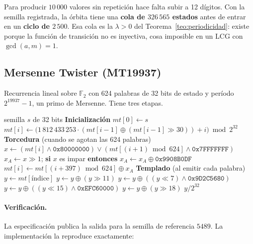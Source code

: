 Para producir $10\,000$ valores sin repetición hace falta subir a 12 dígitos.
Con la semilla registrada, la órbita tiene una \textbf{cola de $326\,565$
estados} antes de entrar en un \textbf{ciclo de $2\,500$}. Esa cola es la
$\lambda > 0$ del Teorema~\ref{teo:periodicidad}: existe porque la función de
transición no es inyectiva, cosa imposible en un LCG con $\gcd(a,m)=1$.

\subsection{Mersenne Twister (MT19937)}

Recurrencia lineal sobre $\mathbb{F}_2$ con 624 palabras de 32 bits de estado y
período $2^{19937}-1$, un primo de Mersenne. Tiene tres etapas.

\begin{algorithm}[H]
\caption{MT19937}
\begin{algorithmic}[1]
\Require semilla $s$ de 32 bits
\Statex \textbf{Inicialización}
\State $mt[0] \gets s$
  \State $mt[i] \gets \bigl(1\,812\,433\,253 \cdot (mt[i-1] \oplus (mt[i-1] \gg 30)) + i\bigr) \bmod 2^{32}$
\EndFor
\Statex \textbf{Torcedura} (cuando se agotan las 624 palabras)
  \State $x \gets (mt[i] \wedge \texttt{0x80000000}) \vee (mt[(i{+}1)\bmod 624] \wedge \texttt{0x7FFFFFFF})$
  \State $x_A \gets x \gg 1$; \textbf{si} $x$ es impar \textbf{entonces} $x_A \gets x_A \oplus \texttt{0x9908B0DF}$
  \State $mt[i] \gets mt[(i{+}397)\bmod 624] \oplus x_A$
\EndFor
\Statex \textbf{Templado} (al emitir cada palabra)
\State $y \gets mt[\text{índice}]$
\State $y \gets y \oplus (y \gg 11)$
\State $y \gets y \oplus ((y \ll 7) \wedge \texttt{0x9D2C5680})$
\State $y \gets y \oplus ((y \ll 15) \wedge \texttt{0xEFC60000})$
\State $y \gets y \oplus (y \gg 18)$
\State \Return $y / 2^{32}$
\end{algorithmic}
\end{algorithm}

\paragraph{Verificación.} La especificación publica la salida para la semilla
de referencia $5489$. La implementación la reproduce exactamente:

\begin{table}[H]
\centering\small

\caption{Primeras palabras de 32 bits con semilla $5489$, contra el vector de
referencia de la especificación (OEIS A221557).}
\label{tab:mt-verificacion}
\end{table}

